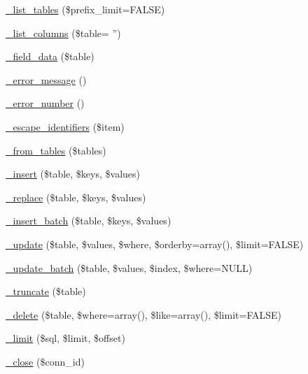 \begin{DoxyCompactItemize}
\hyperlink{class_c_i___d_b__cubrid__driver_a435c0f3ce54fe7daa178baa8532ebd54}{\-\_\-list\-\_\-tables} (\$prefix\-\_\-limit=F\-A\-L\-S\-E)
\item 
\hyperlink{class_c_i___d_b__cubrid__driver_a2a81bb476a5c76fe6f763b0557c1e4c2}{\-\_\-list\-\_\-columns} (\$table= '')
\item 
\hyperlink{class_c_i___d_b__cubrid__driver_a95247d9671893adc3444cb184ad32ea1}{\-\_\-field\-\_\-data} (\$table)
\item 
\hyperlink{class_c_i___d_b__cubrid__driver_a4ca764fe1d6ad526f770f36b5f332bbb}{\-\_\-error\-\_\-message} ()
\item 
\hyperlink{class_c_i___d_b__cubrid__driver_a3e48199b3a946499b7e5fba0cdfa6b86}{\-\_\-error\-\_\-number} ()
\item 
\hyperlink{class_c_i___d_b__cubrid__driver_aeabfb3952399caa92a013621a98e3042}{\-\_\-escape\-\_\-identifiers} (\$item)
\item 
\hyperlink{class_c_i___d_b__cubrid__driver_a885a8b4372b5c099749cefa73767a744}{\-\_\-from\-\_\-tables} (\$tables)
\item 
\hyperlink{class_c_i___d_b__cubrid__driver_a69ee76b136052e0a8f06097fb388e53e}{\-\_\-insert} (\$table, \$keys, \$values)
\item 
\hyperlink{class_c_i___d_b__cubrid__driver_ae0adf73984daf2d42ad29b66c484c82b}{\-\_\-replace} (\$table, \$keys, \$values)
\item 
\hyperlink{class_c_i___d_b__cubrid__driver_a1978e1358c812587a46e242630365099}{\-\_\-insert\-\_\-batch} (\$table, \$keys, \$values)
\item 
\hyperlink{class_c_i___d_b__cubrid__driver_ae869ae2275175c5ffa22816a02099d96}{\-\_\-update} (\$table, \$values, \$where, \$orderby=array(), \$limit=F\-A\-L\-S\-E)
\item 
\hyperlink{class_c_i___d_b__cubrid__driver_acdcbd5642090362dfe49120a222670b9}{\-\_\-update\-\_\-batch} (\$table, \$values, \$index, \$where=N\-U\-L\-L)
\item 
\hyperlink{class_c_i___d_b__cubrid__driver_aa029600528fc1ce660a23ff4b4667f95}{\-\_\-truncate} (\$table)
\item 
\hyperlink{class_c_i___d_b__cubrid__driver_ace3cbc04a520b7811fc956cdb9ae1c19}{\-\_\-delete} (\$table, \$where=array(), \$like=array(), \$limit=F\-A\-L\-S\-E)
\item 
\hyperlink{class_c_i___d_b__cubrid__driver_aeeaa5cd68dc6ace010c0b8aae89c2d15}{\-\_\-limit} (\$sql, \$limit, \$offset)
\item 
\hyperlink{class_c_i___d_b__cubrid__driver_a557bd6ddde8de1f7814e10b1120efd29}{\-\_\-close} (\$conn\-\_\-id)
\end{DoxyCompactItemize}
